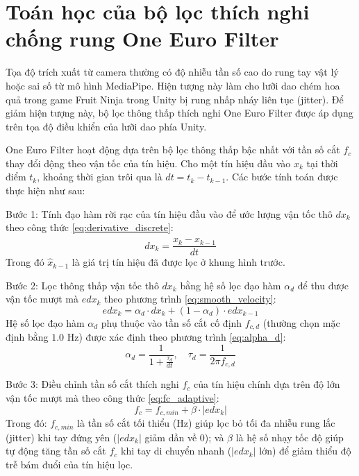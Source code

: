\documentclass[../BTL.tex]{subfiles}
\begin{document}
\section{Toán học của bộ lọc thích nghi chống rung One Euro Filter}
\label{section:2.5}
Tọa độ trích xuất từ camera thường có độ nhiễu tần số cao do rung tay vật lý hoặc sai số từ mô hình MediaPipe. Hiện tượng này làm cho lưỡi dao chém hoa quả trong game Fruit Ninja trong Unity bị rung nhấp nháy liên tục (jitter). Để giảm hiện tượng này, bộ lọc thông thấp thích nghi One Euro Filter \cite{casiez2012one} được áp dụng trên tọa độ điều khiển của lưỡi dao phía Unity.

One Euro Filter hoạt động dựa trên bộ lọc thông thấp bậc nhất với tần số cắt $f_c$ thay đổi động theo vận tốc của tín hiệu. Cho một tín hiệu đầu vào $x_k$ tại thời điểm $t_k$, khoảng thời gian trôi qua là $dt = t_k - t_{k-1}$. Các bước tính toán được thực hiện như sau:

Bước 1: Tính đạo hàm rời rạc của tín hiệu đầu vào để ước lượng vận tốc thô $dx_k$ theo công thức \eqref{eq:derivative_discrete}:
\begin{equation}
\label{eq:derivative_discrete}
dx_k = \frac{x_k - \hat{x}_{k-1}}{dt}
\end{equation}
Trong đó $\hat{x}_{k-1}$ là giá trị tín hiệu đã được lọc ở khung hình trước.

Bước 2: Lọc thông thấp vận tốc thô $dx_k$ bằng hệ số lọc đạo hàm $\alpha_d$ để thu được vận tốc mượt mà $edx_k$ theo phương trình \eqref{eq:smooth_velocity}:
\begin{equation}
\label{eq:smooth_velocity}
edx_k = \alpha_d \cdot dx_k + (1 - \alpha_d) \cdot edx_{k-1}
\end{equation}
Hệ số lọc đạo hàm $\alpha_d$ phụ thuộc vào tần số cắt cố định $f_{c,d}$ (thường chọn mặc định bằng $1.0$ Hz) được xác định theo phương trình \eqref{eq:alpha_d}:
\begin{equation}
\label{eq:alpha_d}
\alpha_d = \frac{1}{1 + \frac{\tau_d}{dt}}, \quad \tau_d = \frac{1}{2\pi f_{c,d}}
\end{equation}

Bước 3: Điều chỉnh tần số cắt thích nghi $f_c$ của tín hiệu chính dựa trên độ lớn vận tốc mượt mà theo công thức \eqref{eq:fc_adaptive}:
\begin{equation}
\label{eq:fc_adaptive}
f_c = f_{c,min} + \beta \cdot |edx_k|
\end{equation}
Trong đó: $f_{c,min}$ là tần số cắt tối thiểu (Hz) giúp lọc bỏ tối đa nhiễu rung lắc (jitter) khi tay đứng yên ($|edx_k|$ giảm dần về 0); và $\beta$ là hệ số nhạy tốc độ giúp tự động tăng tần số cắt $f_c$ khi tay di chuyển nhanh ($|edx_k|$ lớn) để giảm thiểu độ trễ bám đuổi của tín hiệu lọc.
\end{document}
